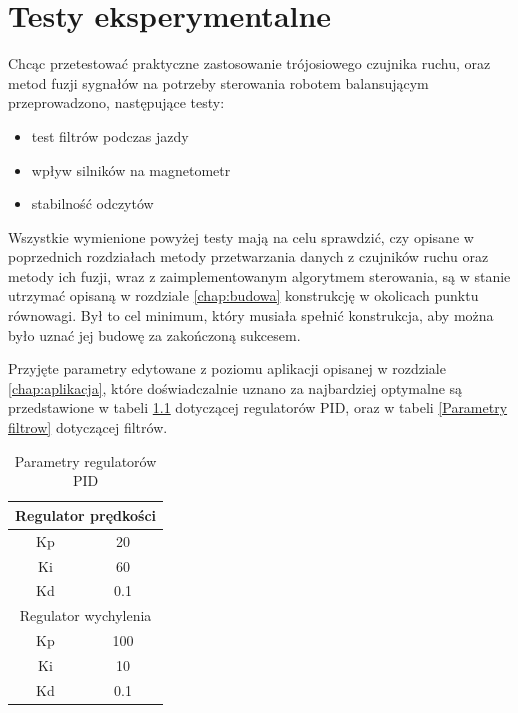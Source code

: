\chapter{Testy eksperymentalne}
\label{chap:Testy eksperymentalne}

Chcąc przetestować praktyczne zastosowanie trójosiowego czujnika ruchu, oraz metod fuzji sygnałów na potrzeby sterowania robotem balansującym przeprowadzono, następujące testy:
\begin{itemize}
	\item test filtrów podczas jazdy
	\item wpływ silników na magnetometr
	\item stabilność odczytów
\end{itemize}

Wszystkie wymienione powyżej testy mają na celu sprawdzić, czy opisane w poprzednich rozdziałach metody przetwarzania danych z czujników ruchu oraz metody ich fuzji, wraz z zaimplementowanym algorytmem sterowania, są w stanie utrzymać opisaną w rozdziale \ref{chap:budowa} konstrukcję w okolicach punktu równowagi. Był to cel minimum, który musiała spełnić konstrukcja, aby można było uznać jej budowę za zakończoną sukcesem. 

Przyjęte parametry edytowane z poziomu aplikacji opisanej w rozdziale \ref{chap:aplikacja}, które doświadczalnie uznano za najbardziej optymalne są przedstawione w tabeli \ref{Parametry regulatorow PID} dotyczącej regulatorów PID, oraz w tabeli \ref{Parametry filtrow} dotyczącej filtrów.

\begin{table}[h!]
    \caption{Parametry regulatorów PID}
    \centering
    \begin{tabular}{|c|c|}
    \hline
    \multicolumn{2}{|c|}{Regulator prędkości} \\ \hline
    Kp                   & 20                  \\ \hline
    Ki                   & 60                  \\ \hline
    Kd                   & 0.1                  \\ \hline
    \hline
    \multicolumn{2}{|c|}{Regulator wychylenia} \\ \hline
    Kp                   & 100                   \\ \hline
    Ki                   & 10                   \\ \hline
    Kd                   & 0.1                   \\ \hline
    \end{tabular}
	\label{Parametry regulatorow PID}
\end{table}

